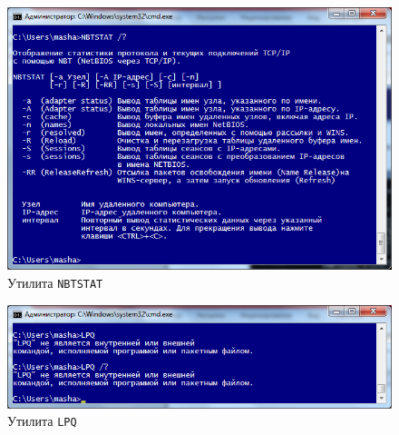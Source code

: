 \begin{figure}[h!]
  \centering
  \includegraphics[width=0.8\linewidth]{pic/nbtstat}
  \caption{Утилита \texttt{NBTSTAT}}
  \label{pic:nbtstat}
\end{figure}

\begin{figure}[h!]
  \centering
  \includegraphics[width=0.8\linewidth]{pic/lpq}
  \caption{Утилита \texttt{LPQ}}
  \label{pic:lpq}
\end{figure}
